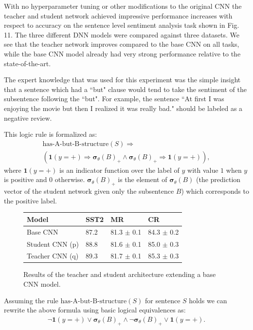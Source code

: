 \documentclass[11pt]{article}
\begin{document}
With no hyperparameter tuning or other modifications to the original CNN the teacher and student network achieved impressive performance increases with respect to accuracy on the sentence level sentiment analysis task shown in Fig. 11.  The three different DNN models were compared against three datasets.  We see that the teacher network improves compared to the base CNN on all tasks, while the base CNN model already had very strong performance relative to the state-of-the-art.

The expert knowledge that was used for this experiment was the simple insight that a sentence which had a ``but" clause would tend to take the sentiment of the subsentence following the ``but".  For example, the sentence ``At first I was enjoying the movie but then I realized it was really bad." should be labeled as a negative review.

This logic rule is formalized as:
\begin{gather*}
\text{has-A-but-B-structure}(S) \Rightarrow \\
(\mathbf{1}(y = +) \Rightarrow \boldsymbol{\sigma}_\theta(B)_+ \land \boldsymbol{\sigma}_\theta(B)_+ \Rightarrow \mathbf{1}(y = +)),
\end{gather*}
where $\mathbf{1}(y = +)$ is an indicator function over the label of $y$ with value $1$ when $y$ is positive and $0$ otherwise.  $\boldsymbol{\sigma}_\theta(B)_+$ is the element of $\boldsymbol{\sigma}_\theta(B)$ (the prediction vector of the student network given only the subsentence $B$) which corresponds to the positive label.
\begin{figure}
	\begin{center}
		\begin{tabular}{ | l | l | l | p{3cm} |}
			\hline
			Model & SST2 & MR & CR \\ \hline
			Base CNN & 87.2 & 81.3 $\pm$ 0.1& 84.3 $\pm$ 0.2  \\
			Student CNN (p) & 88.8 & 81.6 $\pm$ 0.1 & 85.0 $\pm$ 0.3 \\
			Teacher CNN (q) & 89.3 & 81.7 $\pm$ 0.1 & 85.3 $\pm$ 0.3 \\
			\hline
		\end{tabular}
	\end{center}
	\caption{Results of the teacher and student architecture extending a base CNN model.}
\end{figure}
Assuming the rule $\text{has-A-but-B-structure}(S)$ for sentence $S$ holds we can rewrite the above formula using basic logical equivalences as:
\begin{gather}
\neg \mathbf{1}(y = +) \lor \boldsymbol{\sigma}_\theta(B)_+ \land \neg \boldsymbol{\sigma}_\theta(B)_+ \lor \mathbf{1}(y = +).
\end{gather}
\end{document}
